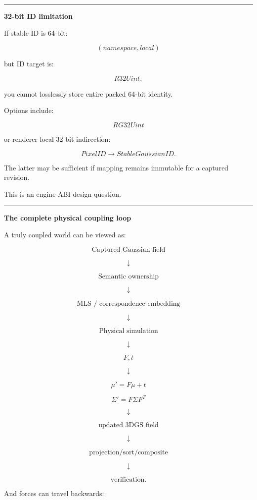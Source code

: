 \begin{center}\rule{0.5\linewidth}{0.5pt}\end{center}

\textbf{32-bit ID limitation}

If stable ID is 64-bit:

\[
(namespace,local)
\]

but ID target is:

\[
R32Uint,
\]

you cannot losslessly store entire packed 64-bit identity.

Options include:

\[
RG32Uint
\]

or renderer-local 32-bit indirection:

\[
PixelID
\rightarrow
StableGaussianID.
\]

The latter may be sufficient if mapping remains immutable for a captured revision.

This is an engine ABI design question.

\begin{center}\rule{0.5\linewidth}{0.5pt}\end{center}

\textbf{The complete physical coupling loop}

A truly coupled world can be viewed as:

\[
\text{Captured Gaussian field}
\]

\[
\downarrow
\]

\[
\text{Semantic ownership}
\]

\[
\downarrow
\]

\[
\text{MLS / correspondence embedding}
\]

\[
\downarrow
\]

\[
\text{Physical simulation}
\]

\[
\downarrow
\]

\[
F,t
\]

\[
\downarrow
\]

\[
\mu'=F\mu+t
\]

\[
\Sigma'=F\Sigma F^T
\]

\[
\downarrow
\]

\[
\text{updated 3DGS field}
\]

\[
\downarrow
\]

\[
\text{projection/sort/composite}
\]

\[
\downarrow
\]

\[
\text{verification}.
\]

And forces can travel backwards:

